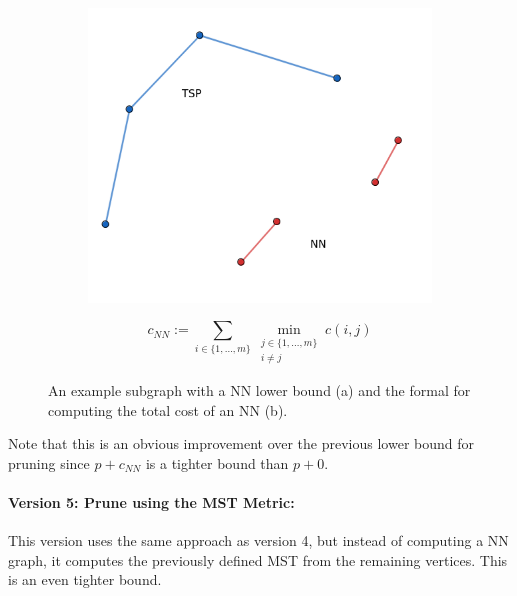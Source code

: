 \begin{figure}[H]
\centering
\begin{subfigure}[c]{0.45\textwidth}
\includegraphics[width=\textwidth]{./assets/nn.png}
\caption{} %
\centering
\end{subfigure}
\begin{subfigure}[c]{0.45\textwidth}
\[
c_{NN} := \sum_{i \in \{1,\dots,m\}} \min_{\substack{j \in \{1,\dots,m\}\\ i \neq j}} c(i,j)
\]
\caption{} %
\end{subfigure}
\caption{An example subgraph with a \ac{NN} lower bound (a) and the formal for computing the total cost of an \ac{NN} (b).}
\end{figure}

Note that this is an obvious improvement over the previous lower bound for pruning since $p+c_{NN}$ is a tighter bound than $p+0$.

\paragraph{Version 5: Prune using the \ac{MST} Metric:}

This version uses the same approach as version 4, but instead of computing a \ac{NN} graph, it computes the previously defined \ac{MST} from the remaining vertices. This is an even tighter bound.

